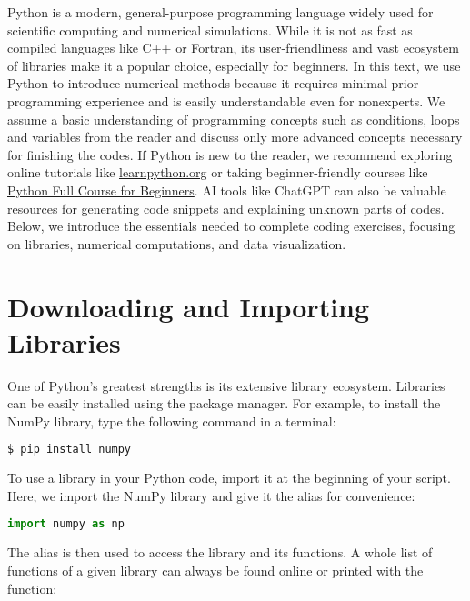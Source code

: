 Python is a modern, general-purpose programming language widely used for scientific computing and numerical simulations. While it is not as fast as compiled languages like C++ or Fortran, its user-friendliness and vast ecosystem of libraries make it a popular choice, especially for beginners. In this text, we use Python to introduce numerical methods because it requires minimal prior programming experience and is easily understandable even for nonexperts. We assume a basic understanding of programming concepts such as conditions, loops and variables from the reader and discuss only more advanced concepts necessary for finishing the codes. If Python is new to the reader, we recommend exploring online tutorials like \href{https://www.learnpython.org/}{learnpython.org} or taking beginner-friendly courses like \href{https://www.youtube.com/watch?v=K5KVEU3aaeQ}{Python Full Course for Beginners}. AI tools like ChatGPT can also be valuable resources for generating code snippets and explaining unknown parts of codes.
Below, we introduce the essentials needed to complete coding exercises, focusing on libraries, numerical computations, and data visualization.



\section*{Downloading and Importing Libraries}

One of Python's greatest strengths is its extensive library ecosystem. Libraries can be easily installed using the  package manager. For example, to install the NumPy library, type the following command in a terminal:

\begin{lstlisting}[language=bash, style=mystyle2]
$ pip install numpy
\end{lstlisting}

To use a library in your Python code, import it at the beginning of your script. Here, we import the NumPy library and give it the alias  for convenience:

\begin{lstlisting}[language=Python, style=mystyle2]
import numpy as np
\end{lstlisting}

The alias is then used to access the library and its functions. A whole list of functions of a given library can always be found online or printed with the  function:

